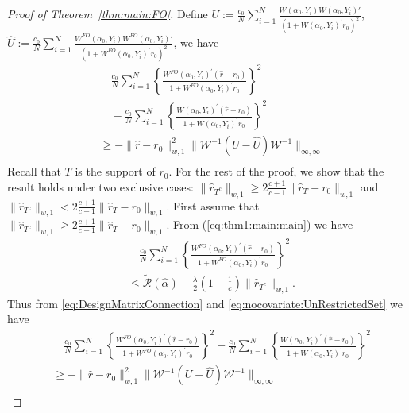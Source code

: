 \documentclass[11pt]{article}
\begin{document}
\begin{proof}[Proof of Theorem~\ref{thm:main:FO}]
Define $\displaystyle U:=\frac{c_0}{N}\sum_{i=1}^N\frac{W(\alpha_0,Y_i)W(\alpha_0,Y_i)'}{(1+W(\alpha_0,Y_i)^\prime r_0)^2}$, $\displaystyle\hat U :=\frac{c_0}{N}\sum_{i=1}^N\frac{W^{FO}(\alpha_0,Y_i)W^{FO}(\alpha_0,Y_i)'}{(1+W^{FO}(\alpha_0,Y_i)^\prime r_0)^2}$, we have 
\begin{equation}\label{eq:DesignMatrixConnection}
\begin{array}{rl}
&\quad\displaystyle\frac{c_0}{N} \sum_{i=1}^N\left\{\frac{W^{FO}(\alpha_0,Y_i)^\prime(\hat{r}-r_0)}{1+W^{FO}(\alpha_0,Y_i)^\prime r_0}\right\}^2\\
&\quad-\displaystyle\frac{c_0}{N} \sum_{i=1}^N\left\{\frac{W(\alpha_0,Y_i)^\prime(\hat{r}-r_0)}{1+W(\alpha_0,Y_i)^\prime r_0}\right\}^2 \\
& \geq \displaystyle -\|\hat r - r_0\|_{w,1}^2 \|\mathcal{W}^{-1}(U-\hat U)\mathcal{W}^{-1}\|_{\infty,\infty} \\
\end{array}\end{equation}
Recall that $T$ is the support of $r_0$. For the rest of the proof, we show that the result holds under two exclusive cases: $\|\hat r_{T^c}\|_{w,1} \geq 2\frac{c+1}{c-1}\|\hat r_T - r_0\|_{w,1}$ and $\|\hat r_{T^c}\|_{w,1}<2\frac{c+1}{c-1}\|\hat r_T - r_0\|_{w,1}$. First assume that $\|\hat r_{T^c}\|_{w,1} \geq 2\frac{c+1}{c-1}\|\hat r_T - r_0\|_{w,1}$.
From (\ref{eq:thm1:main:main}) we have 
\begin{equation}\label{eq:nocovariate:UnRestrictedSet} 
\begin{array}{rl}
&\displaystyle\quad\frac{c_0}{N} \sum_{i=1}^N\left\{\frac{W^{FO}(\alpha_0,Y_i)^\prime(\hat{r}-r_0)}{1+W^{FO}(\alpha_0,Y_i)^\prime r_0}\right\}^2\\
&\displaystyle\leq \widetilde{\mathcal{R}}(\hat\alpha)-\frac{\lambda}{2}\left(1-\frac{1}{c}\right)\|\hat r_{T^c}\|_{w,1}.
\end{array}
\end{equation}
Thus from \eqref{eq:DesignMatrixConnection} and \eqref{eq:nocovariate:UnRestrictedSet} we have 
$$\begin{array}{rl}
&\displaystyle\quad\frac{c_0}{N} \sum_{i=1}^N\left\{\frac{W^{FO}(\alpha_0,Y_i)^\prime(\hat{r}-r_0)}{1+W^{FO}(\alpha_0,Y_i)^\prime r_0}\right\}^2  -   \frac{c_0}{N}\sum_{i=1}^N\left\{\frac{W(\alpha_0,Y_i)^\prime(\hat{r}-r_0)}{1+W(\alpha_0,Y_i)^\prime r_0}\right\}^2 \\
&\displaystyle \geq  -\|\hat r - r_0\|_{w,1}^2 \|\mathcal{W}^{-1}(U-\hat U)\mathcal{W}^{-1}\|_{\infty,\infty} \\

\end{array}$$
\end{proof}
\end{document}
